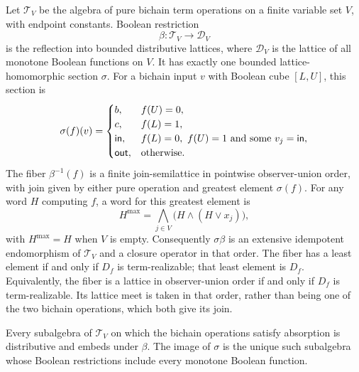 \begin{proposition}
\label{core:prop:boolean-reflection-section}
Let $\mathcal T_V$ be the algebra of pure bichain term operations on a
finite variable set $V$, with endpoint constants. Boolean restriction
\[
 \beta:\mathcal T_V\longrightarrow\mathcal D_V
\]
is the reflection into bounded distributive lattices, where $\mathcal D_V$
is the lattice of all monotone Boolean functions on $V$.
It has exactly one bounded lattice-homomorphic section $\sigma$.
For a bichain input $v$ with Boolean cube $[L,U]$, this section is
\[
 \sigma(f)(v)=
 \begin{cases}
 b,&f(U)=0,\\
 c,&f(L)=1,\\
 \mathsf{in},&f(L)=0,\ f(U)=1\text{ and some }v_j=\mathsf{in},\\
 \mathsf{out},&\text{otherwise}.
 \end{cases}
\]
The fiber $\beta^{-1}(f)$ is a finite join-semilattice in pointwise
observer-union order, with join given by either pure operation and
greatest element $\sigma(f)$. For any word $H$ computing $f$, a word for
this greatest element is
\[
 H^{\max}=\bigwedge_{j\in V}\bigl(H\wedge(H\vee x_j)\bigr),
\]
with $H^{\max}=H$ when $V$ is empty. Consequently
$\sigma\beta$ is an extensive idempotent endomorphism of $\mathcal T_V$
and a closure operator in that order.
The fiber has a least element if and only if $D_f$ is term-realizable;
that least element is $D_f$. Equivalently, the fiber is a lattice in
observer-union order if and only if $D_f$ is term-realizable.
Its lattice meet is taken in that order, rather than being one of the
two bichain operations, which both give its join.

Every subalgebra of $\mathcal T_V$ on which the bichain operations satisfy
absorption is distributive and embeds under $\beta$.
The image of $\sigma$ is the unique such subalgebra
whose Boolean restrictions include every monotone Boolean function.
\end{proposition}
